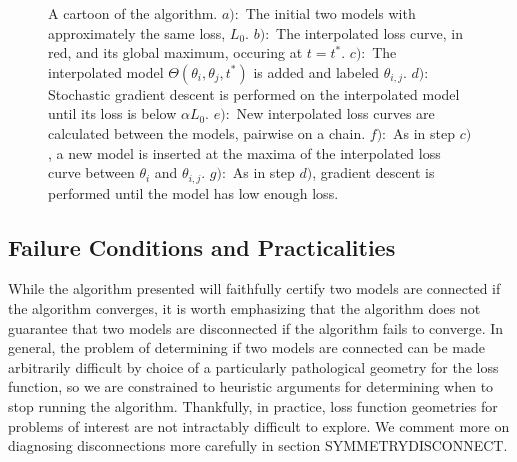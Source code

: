 \documentclass{article} %
\begin{document}
 \begin{figure}
\begin{center}
\end{center}
\caption{A cartoon of the algorithm.  $a):$ The initial two models with approximately the same loss, $L_0$. $b):$ The interpolated loss curve, in red, and its global maximum, occuring at $t=t^*$. $c):$ The interpolated model $\Theta(\theta_i, \theta_j, t^*)$ is added and labeled $\theta_{i,j}$.  $d):$ Stochastic gradient descent is performed on the interpolated model until its loss is below $\alpha L_0$. $e):$ New interpolated loss curves are calculated between the models, pairwise on a chain.  $f):$ As in step $c)$, a new model is inserted at the maxima of the interpolated loss curve between $\theta_i$ and $\theta_{i,j}$.  $g):$  As in step $d)$, gradient descent is performed until the model has low enough loss.}
\label{fig:AlgorithmFigure}
\end{figure}
 
  
  \subsection{Failure Conditions and Practicalities}
  \label{sec:Fail}
  
  While the algorithm presented will faithfully certify two models are connected if the algorithm converges, it is worth emphasizing that the algorithm does not guarantee that two models are disconnected if the algorithm fails to converge.  In general, the problem of determining if two models are connected can be made arbitrarily difficult by choice of a particularly pathological geometry for the loss function, so we are constrained to heuristic arguments for determining when to stop running the algorithm.  Thankfully, in practice, loss function geometries for problems of interest are not intractably difficult to explore.  We comment more on diagnosing disconnections more carefully in section SYMMETRYDISCONNECT.
  
\end{document}
